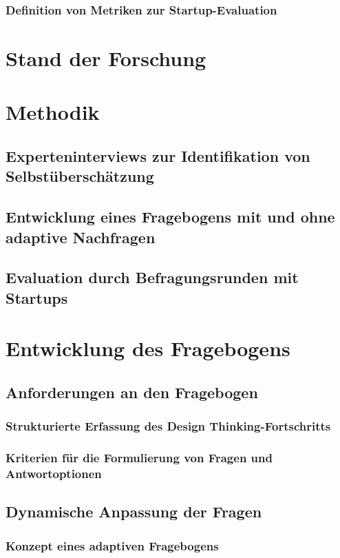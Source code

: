 \subsection{Definition von Metriken zur Startup-Evaluation}

\chapter{Stand der Forschung}

\chapter{Methodik}

\section{Experteninterviews zur Identifikation von Selbstüberschätzung}
\section{Entwicklung eines Fragebogens mit und ohne adaptive Nachfragen}
\section{Evaluation durch  Befragungsrunden mit Startups}

\chapter{Entwicklung des Fragebogens}

\section{Anforderungen an den Fragebogen}
\subsection{Strukturierte Erfassung des Design Thinking-Fortschritts}
\subsection{Kriterien für die Formulierung von Fragen und Antwortoptionen}

\section{Dynamische Anpassung der Fragen}
\subsection{Konzept eines adaptiven Fragebogens}
